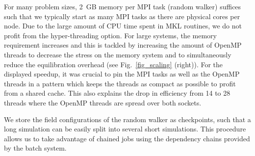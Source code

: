 For many problem sizes, 2~GB memory per MPI task (random walker) suffices such that we typically start as many MPI tasks as there are physical cores per node. Due to the large amount of CPU time spent in MKL routines, we do not profit from the hyper-threading option. For large systems, the memory requirement increases and this is tackled by increasing the amount of OpenMP threads to decrease the stress on the memory system and to simultaneously reduce the equilibration overhead (see Fig.~\ref{fig_scaling} (right)). For the displayed speedup, it was crucial to pin the MPI tasks as well as the OpenMP threads in a pattern which keeps the threads as compact as possible to profit from a shared cache. This also explains the drop in efficiency from 14 to 28 threads where the OpenMP threads are spread over both sockets. 

We store the field configurations of the random walker as checkpoints, such that a long simulation can be easily split into several short simulations. This procedure allows us to take advantage of chained jobs using the dependency chains provided by the batch system.

